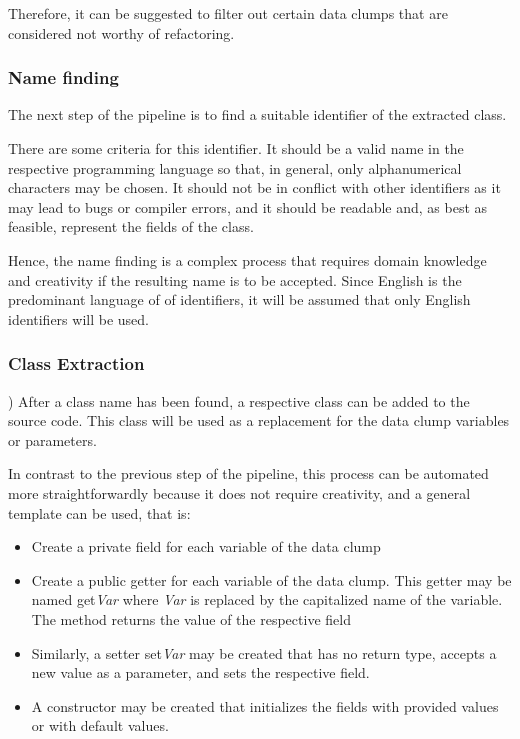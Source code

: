 Therefore, it can be suggested to filter out certain data clumps that are considered not worthy of refactoring.

\subsubsection{Name finding}\label{subsec:chap3_data_clump_name_finding}
The next step of the pipeline is to find a suitable identifier of the extracted class.

There are some criteria for this identifier. It should be a valid name in the respective programming language so that, in general, only alphanumerical characters may be chosen. It should not be  in conflict with other identifiers as it may lead to bugs or compiler errors, and it should be readable and, as best as feasible, represent the fields of the class.

Hence, the name finding is a complex process that requires domain knowledge and creativity if the resulting name is to be accepted. 
Since English is the predominant language of of identifiers, it will be assumed that only English identifiers will be used. 


\subsubsection{Class Extraction}\label{subsec:chap3_data_class_extraction})
After a class name has been found, a respective class can be added to the source code. This class will be used as a replacement  for the data clump variables or parameters. 

In contrast to the previous step of the pipeline, this process can be automated more straightforwardly because it does not require creativity, and a general template can be used, that is:
\begin{itemize}
    \item Create a private field for each variable of the data clump
    \item Create a public getter for each variable of the data clump. This getter may be named get\textit{Var} where \textit{Var} is replaced by the capitalized name of the variable. The method returns the value of the respective field
    \item Similarly, a setter set\textit{Var} may be created that has no return type, accepts a new value as a parameter, and sets the respective field. 
    \item A constructor may be created that initializes the fields with provided values or with default values. 
\end{itemize}

